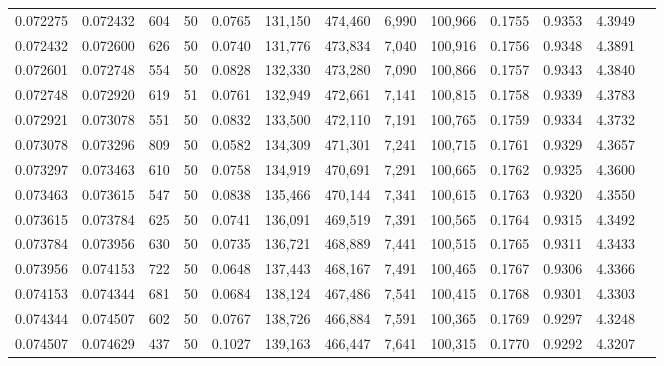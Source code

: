 \begin{tabular}{rrrrrrrrrrrrr}
0.072275 & 0.072432 &   604 &  50 &                                     0.0765 & 131,150 & 474,460 &   6,990 & 100,966 & 0.1755 & 0.9353 & 4.3949 \\
0.072432 & 0.072600 &   626 &  50 &                                     0.0740 & 131,776 & 473,834 &   7,040 & 100,916 & 0.1756 & 0.9348 & 4.3891 \\
0.072601 & 0.072748 &   554 &  50 &                                     0.0828 & 132,330 & 473,280 &   7,090 & 100,866 & 0.1757 & 0.9343 & 4.3840 \\
0.072748 & 0.072920 &   619 &  51 &                                     0.0761 & 132,949 & 472,661 &   7,141 & 100,815 & 0.1758 & 0.9339 & 4.3783 \\
0.072921 & 0.073078 &   551 &  50 &                                     0.0832 & 133,500 & 472,110 &   7,191 & 100,765 & 0.1759 & 0.9334 & 4.3732 \\
0.073078 & 0.073296 &   809 &  50 &                                     0.0582 & 134,309 & 471,301 &   7,241 & 100,715 & 0.1761 & 0.9329 & 4.3657 \\
0.073297 & 0.073463 &   610 &  50 &                                     0.0758 & 134,919 & 470,691 &   7,291 & 100,665 & 0.1762 & 0.9325 & 4.3600 \\
0.073463 & 0.073615 &   547 &  50 &                                     0.0838 & 135,466 & 470,144 &   7,341 & 100,615 & 0.1763 & 0.9320 & 4.3550 \\
0.073615 & 0.073784 &   625 &  50 &                                     0.0741 & 136,091 & 469,519 &   7,391 & 100,565 & 0.1764 & 0.9315 & 4.3492 \\
0.073784 & 0.073956 &   630 &  50 &                                     0.0735 & 136,721 & 468,889 &   7,441 & 100,515 & 0.1765 & 0.9311 & 4.3433 \\
0.073956 & 0.074153 &   722 &  50 &                                     0.0648 & 137,443 & 468,167 &   7,491 & 100,465 & 0.1767 & 0.9306 & 4.3366 \\
0.074153 & 0.074344 &   681 &  50 &                                     0.0684 & 138,124 & 467,486 &   7,541 & 100,415 & 0.1768 & 0.9301 & 4.3303 \\
0.074344 & 0.074507 &   602 &  50 &                                     0.0767 & 138,726 & 466,884 &   7,591 & 100,365 & 0.1769 & 0.9297 & 4.3248 \\
0.074507 & 0.074629 &   437 &  50 &                                     0.1027 & 139,163 & 466,447 &   7,641 & 100,315 & 0.1770 & 0.9292 & 4.3207 \\

\end{tabular}
